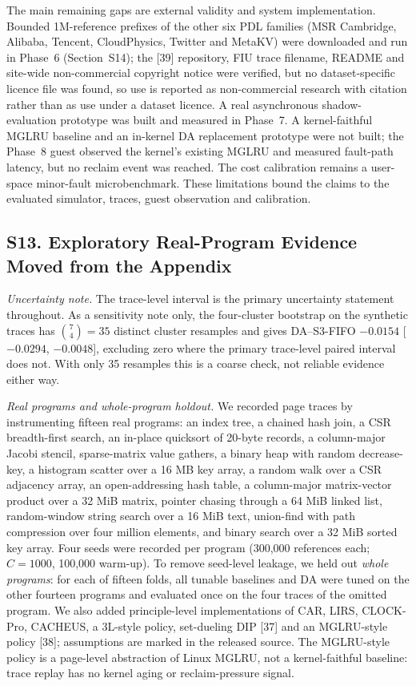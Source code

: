 \documentclass[journal,onecolumn]{IEEEtran}
\begin{document}
The main remaining gaps are external validity and system implementation.
Bounded 1M-reference prefixes of the other six PDL families (MSR Cambridge,
Alibaba, Tencent, CloudPhysics, Twitter and MetaKV) were downloaded and run in
Phase~6 (Section~S14); the [39] repository, FIU trace filename, README and
site-wide non-commercial copyright notice were verified, but no
dataset-specific licence file was found, so use is reported as non-commercial
research with citation rather than as use under a dataset licence. A real
asynchronous shadow-evaluation prototype was built and measured in
Phase~7. A kernel-faithful MGLRU baseline and an in-kernel DA replacement
prototype were not built; the Phase~8 guest observed the kernel's existing
MGLRU and measured fault-path latency, but no reclaim event was reached. The
cost calibration remains a user-space minor-fault microbenchmark. These
limitations bound the claims to the evaluated simulator, traces, guest
observation and calibration.


\subsection*{S13. Exploratory Real-Program Evidence Moved from the Appendix}
\emph{Uncertainty note.} The trace-level interval is the primary uncertainty
statement throughout. As a sensitivity note only, the four-cluster bootstrap
on the synthetic traces has $\binom{7}{4} = 35$ distinct cluster resamples and
gives DA--S3-FIFO $-0.0154$ [$-0.0294$, $-0.0048$], excluding zero where the
primary trace-level paired interval does not. With only 35 resamples this is a
coarse check, not reliable evidence either way.

\emph{Real programs and whole-program holdout.} We recorded page traces by
instrumenting fifteen real programs: an index tree, a chained hash join, a CSR
breadth-first search, an in-place quicksort of 20-byte records, a column-major
Jacobi stencil, sparse-matrix value gathers, a binary heap with random
decrease-key, a histogram scatter over a 16 MB key array, a random walk over a
CSR adjacency array, an open-addressing hash table, a column-major
matrix-vector product over a 32 MiB matrix, pointer chasing through a 64 MiB
linked list, random-window string search over a 16 MiB text, union-find with
path compression over four million elements, and binary search over a 32 MiB
sorted key array. Four seeds were recorded per program (300,000 references
each; $C = 1000$, 100,000 warm-up). To remove seed-level leakage, we held out
\emph{whole programs}: for each of fifteen folds,
all tunable baselines and DA were tuned on the other fourteen programs and
evaluated once on the four traces of the omitted program. We also added
principle-level implementations of CAR, LIRS, CLOCK-Pro, CACHEUS, a 3L-style
policy, set-dueling DIP [37] and an MGLRU-style policy [38]; assumptions are
marked in the released source. The MGLRU-style policy is a page-level
abstraction of Linux MGLRU, not a kernel-faithful baseline: trace replay has no
kernel aging or reclaim-pressure signal.
\end{document}

